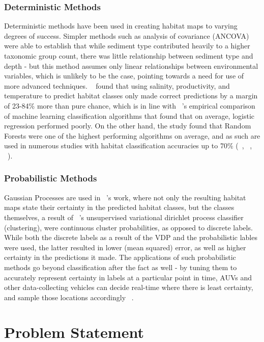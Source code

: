 \documentclass[10pt]{article}
\begin{document}
\begin{multicols}{2}
    \subsubsection{Deterministic Methods}

    Deterministic methods have been used in creating habitat maps to varying degrees of success. Simpler methods such as analysis of covariance (ANCOVA) were able to establish that while sediment type contributed heavily to a higher taxonomic group count, there was little relationship between sediment type and depth - but this method assumes only linear relationships between environmental variables, which is unlikely to be the case, pointing towards a need for use of more advanced techniques. ~\citet{belanger12} found that using salinity, productivity, and temperature to predict habitat classes only made correct predictions by a margin of 23-84\% more than pure chance, which is in line with ~\citet{caruana06}'s empirical comparison of machine learning classification algorithms that found that on average, logistic regression performed poorly. On the other hand, the study found that Random Forests were one of the highest performing algorithms on average, and as such are used in numerous studies with habitat classification accuracies up to 70\% (~\citet{lucieer13}, ~\citet{seiler12}, ~\citet{hasan14}).
    
    \subsubsection{Probabilistic Methods}

    Gaussian Processes are used in ~\citet{bender12}'s work, where not only the resulting habitat maps state their certainty in the predicted habitat classes, but the classes themselves, a result of ~\citet{steinberg11}'s unsupervised variational dirichlet process classifier (clustering), were continuous cluster probabilities, as opposed to discrete labels. While both the discrete labels as a result of the VDP and the probabilistic lables were used, the latter resulted in lower (mean squared) error, as well as higher certainty in the predictions it made. The applications of such probabilistic methods go beyond classification after the fact as well - by tuning them to accurately represent certainty in labels at a particular point in time, AUVs and other data-collecting vehicles can decide real-time where there is least certainty, and sample those locations accordingly ~\citep{rigby10}.

    \section{Problem Statement}


\end{multicols}
\end{document}
